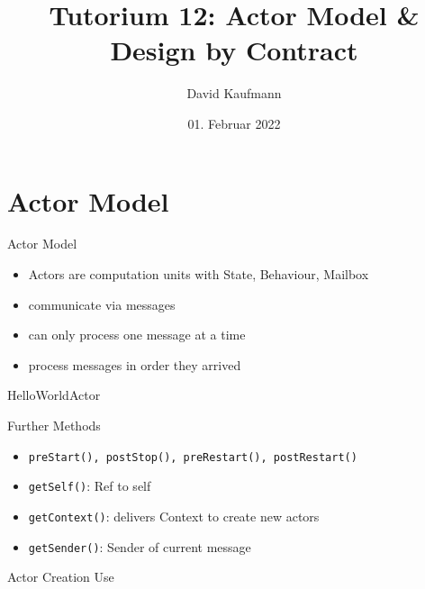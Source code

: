 \documentclass{beamer}
\title{Tutorium 12: Actor Model \& Design by Contract}
\author{David Kaufmann}
\institute{Tutorium Programmierparadigmen am KIT}
\date{01. Februar 2022}
\begin{document}
\begin{frame}
    \titlepage
\end{frame}

\section{Actor Model}
\begin{frame}{Actor Model}
    \begin{itemize}
        \item Actors are computation units with State, Behaviour, Mailbox
        \item communicate via messages
        \item can only process one message at a time
        \item process messages in order they arrived
    \end{itemize}
\end{frame}

\begin{frame}{HelloWorldActor}
    \footnotesize
\end{frame}

\begin{frame}{Further Methods}
    \begin{itemize}
        \item \texttt{preStart(), postStop(), preRestart(), postRestart()}
        \item \texttt{getSelf()}: Ref to self
        \item \texttt{getContext()}: delivers Context to create new actors
        \item \texttt{getSender()}: Sender of current message
    \end{itemize}
\end{frame}

\begin{frame}{Actor Creation}
    Use 
\end{frame}
\end{document}
